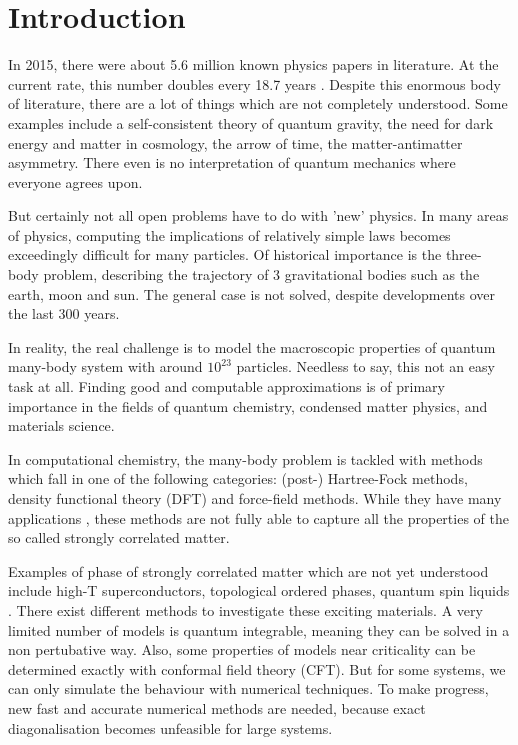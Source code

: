 
\section{Introduction}

In 2015, there were about 5.6 million known physics papers in literature. At the current rate, this number doubles every 18.7 years \cite{Sinatra2015}. Despite this enormous body of literature, there are a lot of things which are not completely understood. Some examples include a self-consistent theory of quantum gravity, the need for dark energy and matter in cosmology, the arrow of time, the matter-antimatter asymmetry. There even is no interpretation of quantum mechanics where everyone agrees upon.

But certainly not all open problems have to do with 'new' physics. In many areas of physics, computing the implications of relatively simple laws becomes exceedingly difficult for many particles. Of historical importance is the three-body problem, describing the trajectory of 3 gravitational bodies such as the earth, moon and sun. The general case is not solved, despite developments over the last 300 years.

In reality, the real challenge is to model the macroscopic properties of quantum many-body system with around $10^{23}$ particles. Needless to say, this not an easy task at all. Finding good and computable approximations is of primary importance in the fields of quantum chemistry, condensed matter physics, and materials science.

In computational chemistry, the many-body problem is tackled with methods which fall in one of the following categories: (post-) Hartree-Fock methods, density functional theory (DFT) and force-field methods. While they have many applications , these methods are not fully able to capture all the properties of the so called strongly correlated matter.

Examples of phase of strongly correlated matter which are not yet understood include high-T superconductors, topological ordered phases, quantum spin liquids \cite{Orus2014}. There exist different methods to investigate these exciting materials. A very limited number of models is quantum integrable, meaning they can be solved in a non pertubative way. Also, some properties of models near criticality can be determined exactly with conformal field theory (CFT). But for some systems, we can only simulate the behaviour with numerical techniques. To make progress, new fast and accurate numerical methods are needed, because exact diagonalisation becomes unfeasible for large systems.

